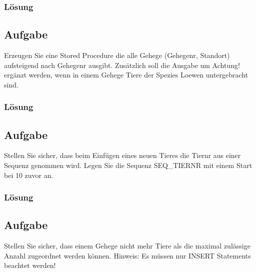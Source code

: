 \subsubsection*{Lösung}
\label{sec:uebung_01.aufgabe_6.loesung}


\subsection{Aufgabe}
\label{sec:uebung_01.aufgabe_07}
Erzeugen Sie eine Stored Procedure die alle Gehege (Gehegenr, Standort) aufsteigend nach Gehegenr ausgibt. Zusätzlich soll die Ausgabe um Achtung! ergänzt werden, wenn in einem Gehege Tiere der Spezies Loewen untergebracht sind.

\subsubsection*{Lösung}
\label{sec:uebung_01.aufgabe_7.loesung}


\subsection{Aufgabe}
\label{sec:uebung_01.aufgabe_08}
Stellen Sie sicher, dass beim Einfügen eines neuen Tieres die Tiernr aus einer Sequenz genommen wird. Legen Sie die Sequenz SEQ\_TIERNR mit einem Start bei 10 zuvor an.

\subsubsection*{Lösung}
\label{sec:uebung_01.aufgabe_8.loesung}


\subsection{Aufgabe}
\label{sec:uebung_01.aufgabe_09}
Stellen Sie sicher, dass einem Gehege nicht mehr Tiere als die maximal zulässige Anzahl zugeordnet werden können.
Hinweis: Es müssen nur INSERT Statements beachtet werden!

